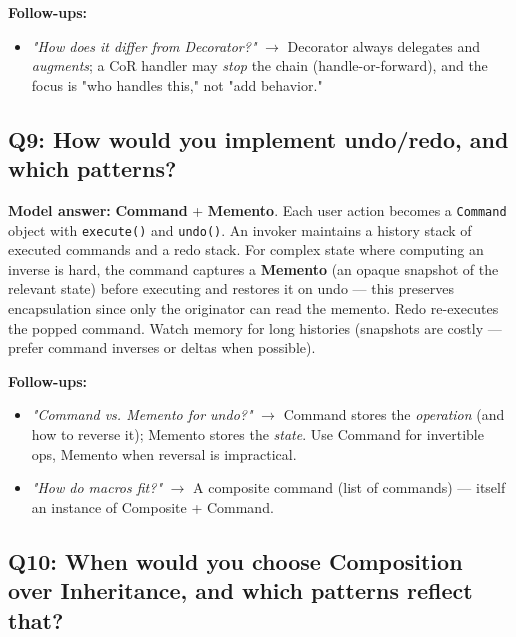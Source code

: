 \documentclass[11pt]{article}
\providecommand{\tightlist}{\setlength{\itemsep}{1pt}\setlength{\parskip}{0pt}}
\begin{document}
\textbf{Follow-ups:}

\begin{itemize}
\tightlist
\item
  \emph{"How does it differ from Decorator?"} \(\rightarrow\) Decorator always delegates and \emph{augments}; a CoR handler may \emph{stop} the chain (handle-or-forward), and the focus is "who handles this," not "add behavior."
\end{itemize}

\subsection{Q9: How would you implement undo/redo, and which patterns?}\label{q9-how-would-you-implement-undoredo-and-which-patterns}

\textbf{Model answer:} \textbf{Command} + \textbf{Memento}. Each user action becomes a \texttt{Command} object with \texttt{execute()} and \texttt{undo()}. An invoker maintains a history stack of executed commands and a redo stack. For complex state where computing an inverse is hard, the command captures a \textbf{Memento} (an opaque snapshot of the relevant state) before executing and restores it on undo --- this preserves encapsulation since only the originator can read the memento. Redo re-executes the popped command. Watch memory for long histories (snapshots are costly --- prefer command inverses or deltas when possible).

\textbf{Follow-ups:}

\begin{itemize}
\tightlist
\item
  \emph{"Command vs. Memento for undo?"} \(\rightarrow\) Command stores the \emph{operation} (and how to reverse it); Memento stores the \emph{state}. Use Command for invertible ops, Memento when reversal is impractical.
\item
  \emph{"How do macros fit?"} \(\rightarrow\) A composite command (list of commands) --- itself an instance of Composite + Command.
\end{itemize}

\subsection{Q10: When would you choose Composition over Inheritance, and which patterns reflect that?}\label{q10-when-would-you-choose-composition-over-inheritance-and-which-patterns-reflect-that}
\end{document}
